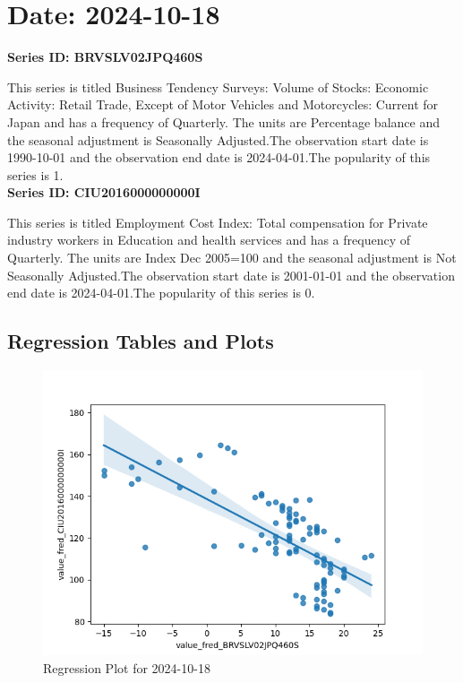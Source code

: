 \section{Date: 2024-10-18}
\noindent \textbf{Series ID: BRVSLV02JPQ460S} 

\noindent This series is titled Business Tendency Surveys: Volume of Stocks: Economic Activity: Retail Trade, Except of Motor Vehicles and Motorcycles: Current for Japan and has a frequency of Quarterly. The units are Percentage balance and the seasonal adjustment is Seasonally Adjusted.The observation start date is 1990-10-01 and the observation end date is 2024-04-01.The popularity of this series is 1. \\ 

\noindent \textbf{Series ID: CIU2016000000000I} 

\noindent This series is titled Employment Cost Index: Total compensation for Private industry workers in Education and health services and has a frequency of Quarterly. The units are Index Dec 2005=100 and the seasonal adjustment is Not Seasonally Adjusted.The observation start date is 2001-01-01 and the observation end date is 2024-04-01.The popularity of this series is 0. \\ 

\subsection{Regression Tables and Plots}


\begin{figure}
\centering
\includegraphics[scale = 0.9]{plots/plot_2024-10-18.png}
\caption{Regression Plot for 2024-10-18}
\end{figure}
\newpage
